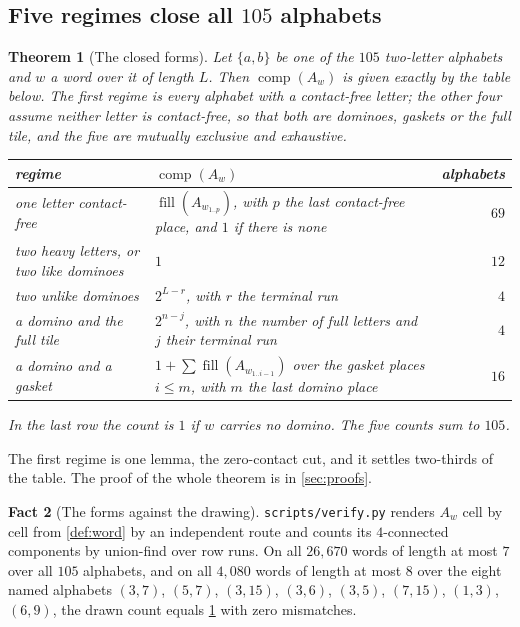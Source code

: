 \documentclass[11pt]{amsart}
\newtheorem{theorem}{Theorem}[section]
\theoremstyle{definition}
\newtheorem{fact}[theorem]{Fact}
\theoremstyle{remark}
\newcommand{\vpy}{\texttt{scripts/\allowbreak verify.py}}
\DeclareMathOperator{\comp}{comp}
\DeclareMathOperator{\fil}{fill}
\begin{document}
\subsection{Five regimes close all $105$ alphabets}

\begin{theorem}[The closed forms]
\label{thm:forms}
Let $\{a,b\}$ be one of the $105$ two-letter alphabets and $w$ a word over it of length $L$. Then $\comp(A_w)$ is given exactly by the table below. The first regime is every alphabet with a contact-free letter; the other four assume neither letter is contact-free, so that both are dominoes, gaskets or the full tile, and the five are mutually exclusive and exhaustive.

\medskip
\begin{tabular}{@{}>{\raggedright\arraybackslash}p{}>{\raggedright\arraybackslash}p{}r@{}}
\toprule
regime & $\comp(A_w)$ & alphabets \\
\midrule
one letter contact-free & $\fil(A_{w_{1..p}})$, with $p$ the last contact-free place, and $1$ if there is none & $69$ \\[2pt]
two heavy letters, or two like dominoes & $1$ & $12$ \\[2pt]
two unlike dominoes & $2^{L-r}$, with $r$ the terminal run & $4$ \\[2pt]
a domino and the full tile & $2^{n-j}$, with $n$ the number of full letters and $j$ their terminal run & $4$ \\[2pt]
a domino and a gasket & $1 + \sum \fil(A_{w_{1..i-1}})$ over the gasket places $i \le m$, with $m$ the last domino place & $16$ \\
\bottomrule
\end{tabular}
\medskip

\noindent In the last row the count is $1$ if $w$ carries no domino. The five counts sum to $105$.
\end{theorem}

The first regime is one lemma, the zero-contact cut, and it settles two-thirds of the table. The proof of the whole theorem is in \cref{sec:proofs}.

\begin{fact}[The forms against the drawing]
\label{fact:forms}
\vpy{} renders $A_w$ cell by cell from \cref{def:word} by an independent route and counts its $4$-connected components by union-find over row runs. On all $26{,}670$ words of length at most $7$ over all $105$ alphabets, and on all $4{,}080$ words of length at most $8$ over the eight named alphabets $(3,7)$, $(5,7)$, $(3,15)$, $(3,6)$, $(3,5)$, $(7,15)$, $(1,3)$, $(6,9)$, the drawn count equals \cref{thm:forms} with zero mismatches.
\end{fact}
\end{document}
